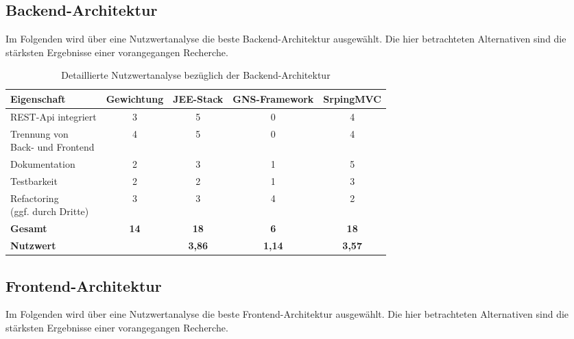 \label{app:nutzwertanalyse}

\subsection{Backend-Architektur}

Im Folgenden wird über eine Nutzwertanalyse die beste Backend-Architektur ausgewählt.
Die hier betrachteten Alternativen sind die stärksten Ergebnisse einer vorangegangen Recherche. 

\begin{table}[H]
	\centering
	\begin{tabular}{lcccc}

		\rowcolor{white!15}				
		\textbf{Eigenschaft} 			& \textbf{Gewichtung}	& \textbf{JEE-Stack}	& \textbf{GNS-Framework} 	& \textbf{SrpingMVC} \\\hline		
		
		REST-Api integriert				& 3						& 5						& 0							& 4 \\
		\pbox{4cm}{Trennung von \\ Back- und Frontend}	& 4						& 5						& 0							& 4 \\						
		Dokumentation					& 2						& 3						& 1							& 5 \\
		Testbarkeit						& 2						& 2						& 1							& 3 \\
		\pbox{4cm}{Refactoring \\(ggf. durch Dritte)}	& 3						& 3						& 4							& 2 \\
		
		\rowcolor{MidnightBlue!15}
		\textbf{Gesamt}				& \textbf{14}			& \textbf{18}			& \textbf{6}				& \textbf{18} \\\hline
		\rowcolor{white!15}				
		\textbf{Nutzwert} 				& 						& \textbf{3,86}			& \textbf{1,14} 			& \textbf{3,57} \\
											
			    
	\end{tabular}
	
	\caption{Detaillierte Nutzwertanalyse bezüglich der Backend-Architektur}
	\label{tab:nutzwertanalyse_backend}
\end{table}


\subsection{Frontend-Architektur}

Im Folgenden wird über eine Nutzwertanalyse die beste Frontend-Architektur ausgewählt.
Die hier betrachteten Alternativen sind die stärksten Ergebnisse einer vorangegangen Recherche. 

